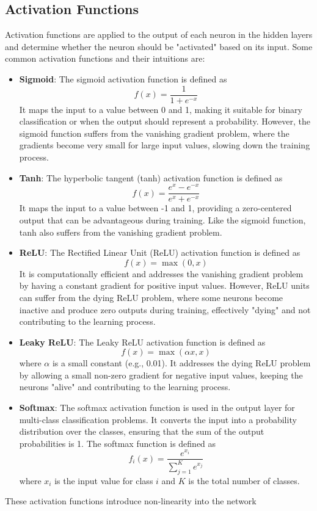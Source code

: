 \documentclass[12pt]{article}
\begin{document}
\subsection{Activation Functions}

Activation functions are applied to the output of each neuron in the hidden layers and determine whether the neuron should be "activated" based on its input. Some common activation functions and their intuitions are:

\begin{itemize}
\item \textbf{Sigmoid}: The sigmoid activation function is defined as $$f(x) = \frac{1}{1 + e^{-x}}$$ It maps the input to a value between 0 and 1, making it suitable for binary classification or when the output should represent a probability. However, the sigmoid function suffers from the vanishing gradient problem, where the gradients become very small for large input values, slowing down the training process.

\item \textbf{Tanh}: The hyperbolic tangent (tanh) activation function is defined as $$f(x) = \frac{e^x - e^{-x}}{e^x + e^{-x}}$$ It maps the input to a value between -1 and 1, providing a zero-centered output that can be advantageous during training. Like the sigmoid function, tanh also suffers from the vanishing gradient problem.

\item \textbf{ReLU}: The Rectified Linear Unit (ReLU) activation function is defined as $$f(x) = \max(0, x)$$It is computationally efficient and addresses the vanishing gradient problem by having a constant gradient for positive input values. However, ReLU units can suffer from the dying ReLU problem, where some neurons become inactive and produce zero outputs during training, effectively "dying" and not contributing to the learning process.

\item \textbf{Leaky ReLU}: The Leaky ReLU activation function is defined as $$f(x) = \max(\alpha x, x)$$ where $\alpha$ is a small constant (e.g., 0.01). It addresses the dying ReLU problem by allowing a small non-zero gradient for negative input values, keeping the neurons "alive" and contributing to the learning process.

\item {\textbf{Softmax}: The softmax activation function is used in the output layer for multi-class classification problems. It converts the input into a probability distribution over the classes, ensuring that the sum of the output probabilities is 1. The softmax function is defined as
$$f_i(x) = \frac{e^{x_i}}{\sum_{j=1}^K e^{x_j}}$$
where $x_i$ is the input value for class $i$ and $K$ is the total number of classes.}
\end{itemize}
These activation functions introduce non-linearity into the network
\end{document}
